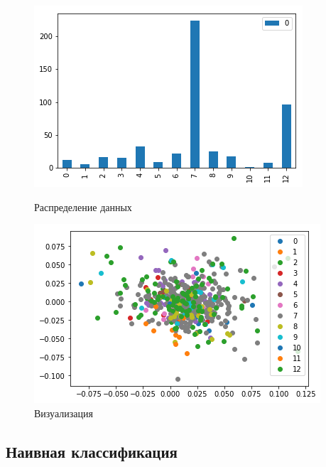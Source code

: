 \documentclass[12pt]{article}
\begin{document}
\begin{figure}[h]
\begin{center}
\begin{minipage}[h]{0.45\linewidth}
\includegraphics[width=1\linewidth]{Images/data_distribution.pdf}
\caption{Распределение данных} %
\label{distr} %
\end{minipage}
\hfill
\begin{minipage}[h]{0.45\linewidth}
\includegraphics[width=1\linewidth]{Images/visualizationPCA.pdf}
\caption{Визуализация}
\label{vis}
\end{minipage}
\end{center}
\end{figure}


\subsection{Наивная классификация}
\end{document}
